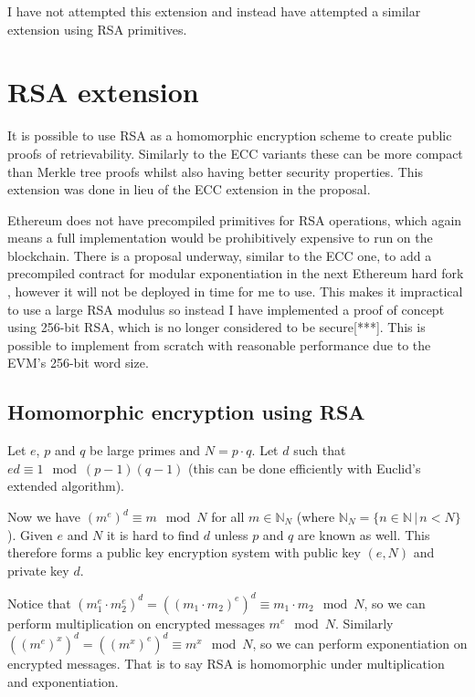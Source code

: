 \documentclass[12pt,a4paper,twoside,openright]{report}
\begin{document}
I have not attempted this extension and instead have attempted a similar extension using RSA primitives.


\section{RSA extension}

It is possible to use RSA as a homomorphic encryption scheme to create public proofs of retrievability.
Similarly to the ECC variants these can be more compact than Merkle tree proofs whilst also having better security properties.
This extension was done in lieu of the ECC extension in the proposal.

Ethereum does not have precompiled primitives for RSA operations, which again means a full implementation
would be prohibitively expensive to run on the blockchain.
There is a proposal underway, similar to the ECC one, to add a precompiled contract for modular exponentiation in the next Ethereum hard fork \cite{eip-rsa},
however it will not be deployed in time for me to use.
This makes it impractical to use a large RSA modulus so instead I have implemented a proof of concept using 256-bit RSA, which is no longer considered to be secure[***].
This is possible to implement from scratch with reasonable performance due to the EVM's 256-bit word size.



\subsection{Homomorphic encryption using RSA}

Let $e$, $p$ and $q$ be large primes and $N = p \cdot q$.
Let $d$ such that $e d \equiv 1 \mod (p-1)(q-1)$ (this can be done efficiently with Euclid's extended algorithm).

Now we have $(m^e)^d \equiv m \mod N$ for all $m \in \mathbb{N}_N$  (where $\mathbb{N}_N = \{n \in \mathbb{N} \,|\, n < N\}$).
Given $e$ and $N$ it is hard to find $d$ unless $p$ and $q$ are known as well.
This therefore forms a public key encryption system with public key $(e, N)$ and private key $d$.

Notice that $(m_1^e \cdot m_2^e)^d = \left((m_1 \cdot m_2)^e\right)^d \equiv m_1 \cdot m_2 \mod N$, so we can perform multiplication on
encrypted messages $m^e \mod N$.
Similarly $\left(\left(m^e\right)^x\right)^d = \left(\left(m^x\right)^e\right)^d \equiv m^x \mod N$, so we can perform exponentiation on encrypted messages.
That is to say RSA is homomorphic under multiplication and exponentiation.
\end{document}
